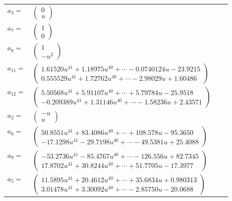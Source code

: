 \documentclass[1p]{elsarticle_modified}
\theoremstyle{definition}
\begin{document}
\begin{tabular}{m{7pt} m{180pt} m{7pt} m{180pt} }
\flushright $a_{3}=$&$\begin{pmatrix}0\\u\end{pmatrix}$ \\
\flushright $a_{7}=$&$\begin{pmatrix}1\\0\end{pmatrix}$ \\
\flushright $a_{8}=$&$\begin{pmatrix}1\\- u^2\end{pmatrix}$ \\
\flushright $a_{11}=$&$\begin{pmatrix}1.61520 u^{41}+1.18975 u^{40}+\cdots-0.0740124 u-23.9215\\0.555529 u^{41}+1.72762 u^{40}+\cdots-2.98029 u+1.60486\end{pmatrix}$ \\
\flushright $a_{12}=$&$\begin{pmatrix}5.50568 u^{41}+5.91107 u^{40}+\cdots+5.79784 u-25.9518\\-0.209389 u^{41}+1.31146 u^{40}+\cdots-1.58236 u+2.43571\end{pmatrix}$ \\
\flushright $a_{2}=$&$\begin{pmatrix}- u\\u\end{pmatrix}$ \\
\flushright $a_{6}=$&$\begin{pmatrix}50.8551 u^{41}+83.4086 u^{40}+\cdots+108.578 u-95.3650\\-17.1298 u^{41}-29.7198 u^{40}+\cdots-49.5381 u+25.4088\end{pmatrix}$ \\
\flushright $a_{9}=$&$\begin{pmatrix}-53.2736 u^{41}-85.4767 u^{40}+\cdots-126.556 u+82.7345\\17.8702 u^{41}+30.8244 u^{40}+\cdots+51.7705 u-17.3977\end{pmatrix}$ \\
\flushright $a_{5}=$&$\begin{pmatrix}11.5895 u^{41}+20.4612 u^{40}+\cdots+35.6834 u+0.980313\\3.01478 u^{41}+3.30092 u^{40}+\cdots-2.85750 u-20.0688\end{pmatrix}$ \\

\end{tabular}
\end{document}
